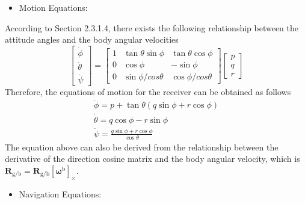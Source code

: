 \begin{itemize}	
	\item  
	Motion Equations:
\end{itemize}

According to Section 2.3.1.4, there exists the following relationship between the attitude angles and the body angular velocities
\begin{equation}\label{eq4.39}
\left[ {\begin{array}{*{20}{c}}
	{\dot \phi }\\
	{\dot \theta }\\
	{\dot \psi }
	\end{array}} \right] = \left[ {\begin{array}{*{20}{c}}
	1&{\tan \theta \sin \phi }&{\tan \theta \cos \phi }\\
	0&{\cos \phi }&{ - \sin \phi }\\
	0&{\sin \phi /cos\theta} &{\cos \phi/cos\theta } 
	\end{array}} \right] \left[ {\begin{array}{*{20}{c}}
	p\\
	q\\
	r
	\end{array}} \right]
\end{equation}
Therefore, the equations of motion for the receiver can be obtained as follows
\begin{equation}\label{eq4.40}
\begin{array}{l}
\dot \phi  = p + \tan \theta \left( {q\sin \phi  + r\cos \phi } \right)\\
\dot \theta  = q\cos \phi  - r\sin \phi \\
\dot \psi  = \frac{{q\sin \phi  + r\cos \phi }}{{\cos \theta }}
\end{array}
\end{equation}
The equation above can also be derived from the relationship between the derivative of the direction cosine matrix and the body angular velocity, which is $\dot{\mathbf{ R}}\mathrm{_{g/b}} = \mathbf{ R}\mathrm{_{g/b}}\left[ \bm{\omega}\mathrm{^b}\right]_ \times$.

\begin{itemize}	
	\item  
	Navigation Equations:
\end{itemize}


